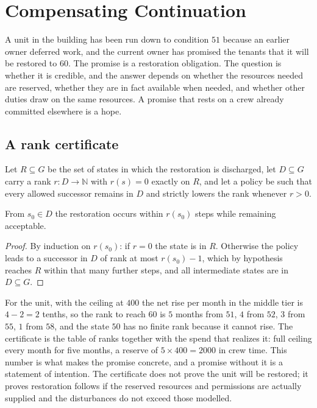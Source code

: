 \chapter{Compensating Continuation}\label{ch:14}

A unit in the building has been run down to condition $51$ because an earlier owner deferred work, and the current owner has promised the tenants that it will be restored to $60$. The promise is a restoration obligation. The question is whether it is credible, and the answer depends on whether the resources needed are reserved, whether they are in fact available when needed, and whether other duties draw on the same resources. A promise that rests on a crew already committed elsewhere is a hope.

\section{A rank certificate}

Let $R\subseteq G$ be the set of states in which the restoration is discharged, let $D\subseteq G$ carry a rank $r:D\to\mathbb N$ with $r(s)=0$ exactly on $R$, and let a policy be such that every allowed successor remains in $D$ and strictly lowers the rank whenever $r>0$.

\begin{proposition}\label{prop:P07}
From $s_0\in D$ the restoration occurs within $r(s_0)$ steps while remaining acceptable.
\end{proposition}

\begin{proof}
By induction on $r(s_0)$: if $r=0$ the state is in $R$. Otherwise the policy leads to a successor in $D$ of rank at most $r(s_0)-1$, which by hypothesis reaches $R$ within that many further steps, and all intermediate states are in $D\subseteq G$.
\end{proof}

For the unit, with the ceiling at $400$ the net rise per month in the middle tier is $4-2=2$ tenths, so the rank to reach $60$ is $5$ months from $51$, $4$ from $52$, $3$ from $55$, $1$ from $58$, and the state $50$ has no finite rank because it cannot rise. The certificate is the table of ranks together with the spend that realizes it: full ceiling every month for five months, a reserve of $5\times 400=2000$ in crew time. This number is what makes the promise concrete, and a promise without it is a statement of intention. The certificate does not prove the unit will be restored; it proves restoration follows if the reserved resources and permissions are actually supplied and the disturbances do not exceed those modelled.

